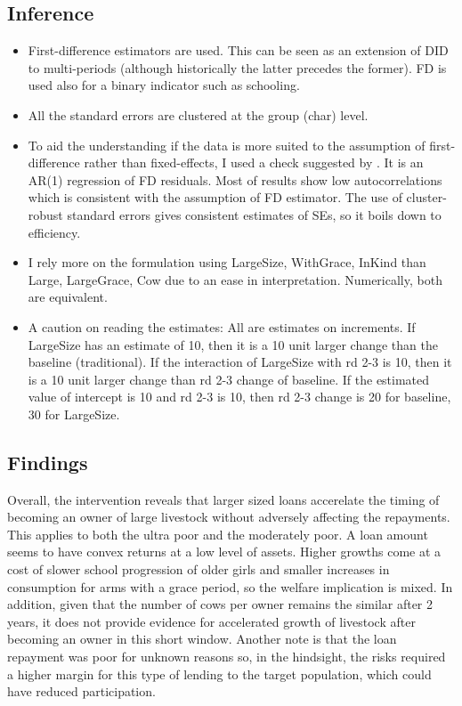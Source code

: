 \subsection{Inference}

\begin{itemize}
\vspace{1.0ex}\setlength{\itemsep}{1.0ex}\setlength{\baselineskip}{12pt}
\item	First-difference estimators are used. This can be seen as an extension of DID to multi-periods (although historically the latter precedes the former). FD is used also for a binary indicator such as schooling.
\item	All the standard errors are clustered at the group (char) level.
\item	To aid the understanding if the data is more suited to the assumption of first-difference rather than fixed-effects, I used a check suggested by \citet[][10.71]{Wooldridge2010}. It is an AR(1) regression of FD residuals. Most of results show low autocorrelations which is consistent with the assumption of FD estimator. The use of cluster-robust standard errors gives consistent estimates of SEs, so it boils down to efficiency. 
\item	I rely more on the formulation using \textsf{LargeSize, WithGrace, InKind} than \textsf{Large, LargeGrace, Cow} due to an ease in interpretation. Numerically, both are equivalent.
\item	A caution on reading the estimates: All are estimates on increments. If \textsf{LargeSize} has an estimate of 10, then it is a 10 unit larger change than the baseline (traditional). If the interaction of \textsf{LargeSize} with rd 2-3 is 10, then it is a 10 unit larger change than rd 2-3 change of baseline. If the estimated value of intercept is 10 and rd 2-3 is 10, then rd 2-3 change is 20 for baseline, 30 for \textsf{LargeSize}. 
\end{itemize}

\subsection{Findings}

Overall, the intervention reveals that larger sized loans accerelate the timing of becoming an owner of large livestock without adversely affecting the repayments. This applies to both the ultra poor and the moderately poor. A loan amount seems to have convex returns at a low level of assets. Higher growths come at a cost of slower school progression of older girls and smaller increases in consumption for arms with a grace period, so the welfare implication is mixed. In addition, given that the number of cows per owner remains the similar after 2 years, it does not provide evidence for accelerated growth of livestock after becoming an owner in this short window. Another note is that the loan repayment was poor for unknown reasons so, in the hindsight, the risks required a higher margin for this type of lending to the target population, which could have reduced participation.

